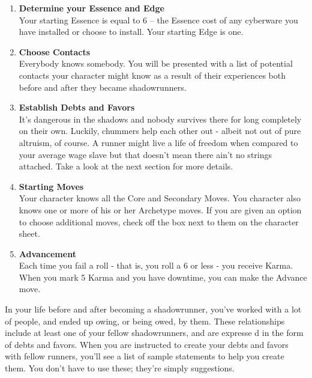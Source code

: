 \begin{enumerate}
    \item \textbf{Determine your Essence and Edge} \\
    Your starting Essence is equal to 6 – the Essence cost of any cyberware you have installed or choose to install. Your starting Edge is one.
    
    \item \textbf{Choose Contacts} \\
    Everybody knows somebody. You will be presented with a list of potential contacts your character might know as a result of their experiences both before and after they became shadowrunners.
    
    \item \textbf{Establish Debts and Favors} \\
    It's dangerous in the shadows and nobody survives there for long completely on their own. Luckily, chummers help each other out - albeit not out of pure altruism, of course. A runner might live a life of freedom when compared to your average wage slave but that doesn't mean there ain't no strings attached. Take a look at the next section for more details.
    
    \item \textbf{Starting Moves} \\
    Your character knows all the Core and Secondary Moves. You character also knows one or more of his or her Archetype moves. If you are given an option to choose additional moves, check off the box next to them on the character sheet.
    
    \item \textbf{Advancement} \\
    Each time you fail a roll - that is, you roll a 6 or less - you receive Karma. When you mark 5 Karma and you have downtime, you can make the Advance move.
\end{enumerate}


In your life before and after becoming a shadowrunner, you’ve worked with a lot of people, and ended up owing, or being owed, by them. These relationships include at least one of your fellow shadowrunners, and are expresse d in the form of debts and favors. When you are instructed to create your debts and favors with fellow runners, you’ll see a list of sample statements to help you create them. You don’t have to use these; they’re simply suggestions.
    
